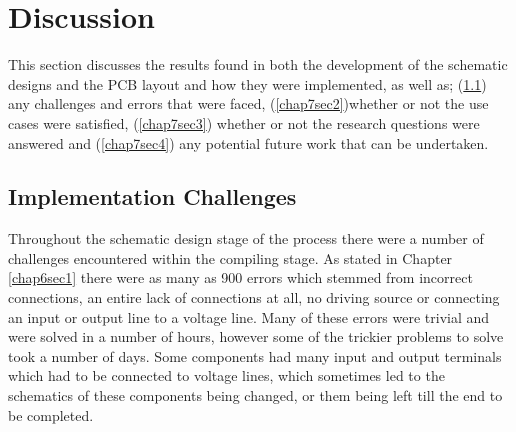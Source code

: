 
\chapter{Discussion} %

\label{Chapter7} %

This section discusses the results found in both the development of the schematic designs and the PCB layout and  how they were implemented, as well as; (\ref{chap7sec1}) any challenges and errors that were faced, (\ref{chap7sec2})whether or not the use cases were satisfied, (\ref{chap7sec3}) whether or not the research questions were answered and (\ref{chap7sec4}) any potential future work that can be undertaken.

\section{Implementation Challenges}
\label{chap7sec1}

	Throughout the schematic design stage of the process there were a number of challenges encountered within the compiling stage. 
As stated in Chapter \ref{chap6sec1} there were as many as 900 errors which stemmed from incorrect connections, an entire lack of connections at all, no driving source or connecting an input or output line to a voltage line. 
Many of these errors were trivial and were solved in a number of hours, however some of the trickier problems to solve took a number of days.
Some components had many input and output terminals which had to be connected to voltage lines, which sometimes led to the schematics of these components being changed, or them being left till the end to be completed.\\

